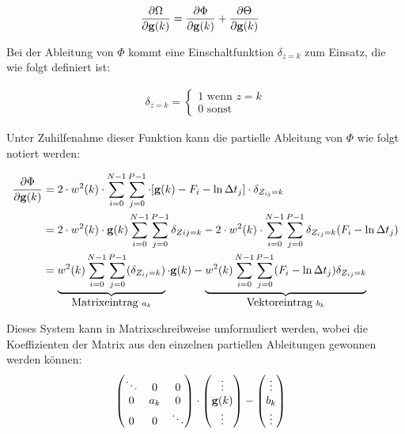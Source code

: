 \begin{align}
\label{eq:energy:partial}
\frac{\partial \Omega}{\partial \mathbf g(k)} 
	& = \frac{\partial \Phi}{\partial \mathbf g(k)} +\frac{\partial \Theta}{\partial \mathbf g(k)}
\end{align}
	
	Bei der Ableitung von $\Phi$ kommt eine Einschaltfunktion $\delta_{z=k}$ zum Einsatz, die wie folgt definiert ist:

\begin{align}
	\delta_{z=k} = \begin{cases}
    		1 \mbox{ wenn } z = k\\
	    0 \mbox{ sonst}
    \end{cases}
\end{align}

Unter Zuhilfenahme dieser Funktion kann die partielle Ableitung von $\Phi$ wie folgt notiert werden:

\begin{align}
\frac{\partial \Phi}{\partial \mathbf g(k)} 
	&= 2\cdot w^2(k) \cdot \sum \limits_{i=0}^{N-1} \sum \limits_{j=0}^{P-1} \cdot[\mathbf g(k) - F_i - \ln \Delta t_j]\cdot \delta_{Z_{ij}=k}\\
&=2\cdot w^2(k) \cdot \mathbf g(k) \sum \limits_{i=0}^{N-1} \sum \limits_{j=0}^{P-1}\delta_{Z{ij}=k} - 2\cdot w^2(k)\cdot\sum \limits_{i=0}^{N-1} \sum \limits_{j=0}^{P-1}\delta_{Z_{ij}=k}(F_i - \ln \Delta t_j)\\
\label{eq:1}
 &= \underbrace{
        w^2(k) \sum_{i=0}^{N-1} \sum_{j=0}^{P-1}(\delta_{Z_{ij}=k})
    }_{\mbox{Matrixeintrag }a_k} 
    \cdot \mathbf g(k) - 
    \underbrace{
        w^2(k) \sum_{i=0}^{N-1} \sum_{j=0}^{P-1}(F_i - \ln \Delta t_j)\delta_{Z_{ij}=k}
    }_{\mbox{Vektoreintrag }b_k}
\end{align}
    
Dieses System kann in Matrixschreibweise umformuliert werden, wobei die Koeffizienten der Matrix aus den einzelnen partiellen Ableitungen gewonnen werden können:
    \begin{align}
    \label{eq:matrix:data}
&
\begin{pmatrix}
\ddots & 0& 0\\
0 & a_k & 0\\
0 & 0 & \ddots
\end{pmatrix}
 \cdot \begin{pmatrix}
 \vdots\\
 \mathbf g(k)\\
 \vdots
 \end{pmatrix} - 
\begin{pmatrix}
 \vdots\\
 b_k\\
 \vdots
 \end{pmatrix} 
\end{align}


